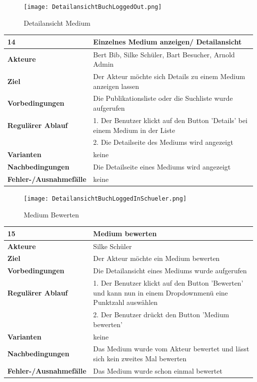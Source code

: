 \documentclass[fontsize=12pt,paper=a4,twoside]{scrartcl}
\begin{document}
\begin{figure}
	[H] \caption{Detailansicht Medium} 
	\texttt{[image: DetailansichtBuchLoggedOut.png]} \label{pic:DetailansichtMedium} 
\end{figure}
\begin{table}
	[H] \label{14} 
	\begin{tabular}
		{|l|p{10cm}|} \hline \textbf{14} & \textbf{Einzelnes Medium anzeigen/ Detailansicht} \\
		\hline \textbf{Akteure} & Bert Bib, Silke Schüler, Bart Besucher, Arnold Admin\\
		\hline \textbf{Ziel} & Der Akteur möchte sich Details zu einem Medium anzeigen lassen \\
		\hline \textbf{Vorbedingungen} & Die Publikationsliste oder die Suchliste wurde aufgerufen \\
		\hline \textbf{Regulärer Ablauf} & 1. Der Benutzer klickt auf den Button 'Details' bei einem Medium in der Liste \\
		&2. Die Detailseite des Mediums wird angezeigt\\
		\hline \textbf{Varianten} & keine \\
		\hline \textbf{Nachbedingungen} & Die Detailseite eines Mediums wird angezeigt\\
		\hline \textbf{Fehler-/Ausnahmefälle} & keine\\
		\hline 
	\end{tabular}
\end{table}
\begin{figure}
	[H] \caption{Medium Bewerten} 
	\texttt{[image: DetailansichtBuchLoggedInSchueler.png]} \label{pic:MedBewerten} 
\end{figure}
\begin{table}
	[htbp] \label{15} 
	\begin{tabular}
		{|l|p{10cm}|} \hline \textbf{15} & \textbf{Medium bewerten} \\
		\hline \textbf{Akteure} & Silke Schüler\\
		\hline \textbf{Ziel} & Der Akteur möchte ein Medium bewerten \\
		\hline \textbf{Vorbedingungen} & Die Detailansicht eines Mediums wurde aufgerufen \\
		\hline \textbf{Regulärer Ablauf} & 1. Der Benutzer klickt auf den Button 'Bewerten' und kann nun in einem Dropdownmenü eine Punktzahl auswählen\\
		&2. Der Benutzer drückt den Button 'Medium bewerten'\\
		\hline \textbf{Varianten} & keine \\
		\hline \textbf{Nachbedingungen} & Das Medium wurde vom Akteur bewertet und lässt sich kein zweites Mal bewerten\\
		\hline \textbf{Fehler-/Ausnahmefälle} & Das Medium wurde schon einmal bewertet\\
		\hline 
	\end{tabular}
\end{table}
\end{document}
